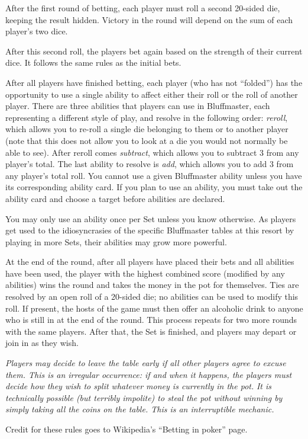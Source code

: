 \documentclass[green]{Kos}
\begin{document}
After the first round of betting, each player must roll a second 20-sided die, keeping the result hidden. Victory in the round will depend on the sum of each player's two dice.

After this second roll, the players bet again based on the strength of their current dice. It follows the same rules as the initial bets.

After all players have finished betting, each player (who has not ``folded'') has the opportunity to use a single ability to affect either their roll or the roll of another player. There are three abilities that players can use in Bluffmaster, each representing a different style of play, and resolve in the following order: \emph{reroll}, which allows you to re-roll a single die belonging to them or to another player (note that this does not allow you to look at a die you would not normally be able to see). After reroll comes \emph{subtract}, which allows you to subtract 3 from any player's total. The last ability to resolve is \emph{add}, which allows you to add 3 from any player's total roll. You cannot use a given Bluffmaster ability unless you have its corresponding ability card. If you plan to use an ability, you must take out the ability card and choose a target before abilities are declared. 

You may only use an ability once per Set unless you know otherwise. As players get used to the idiosyncrasies of the specific Bluffmaster tables at this resort by playing in more Sets, their abilities may grow more powerful. 

At the end of the round, after all players have placed their bets and all abilities have been used, the player with the highest combined score (modified by any abilities) wins the round and takes the money in the pot for themselves. Ties are resolved by an open roll of a 20-sided die; no abilities can be used to modify this roll. If present, the hosts of the game must then offer an alcoholic drink to anyone who is still in at the end of the round. This process repeats for two more rounds with the same players. After that, the Set is finished, and players may depart or join in as they wish.

\emph{Players may decide to leave the table early if all other players agree to excuse them. This is an irregular occurrence: if and when it happens, the players must decide how they wish to split whatever money is currently in the pot.}
\emph{It is technically possible (but terribly impolite) to steal the pot without winning by simply taking all the coins on the table. This is an interruptible mechanic.}

\begin{itemz}[Notes]
\item Credit for these rules goes to Wikipedia's ``Betting in poker'' page.
\end{itemz}
\end{document}
